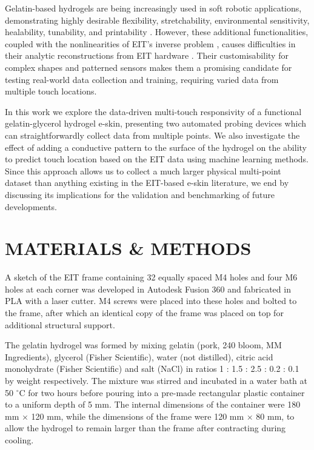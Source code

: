 Gelatin-based hydrogels are being increasingly used in soft robotic applications, demonstrating highly desirable flexibility, stretchability, environmental sensitivity, healability, tunability, and printability \cite{Heiden2022, Hardman2022, baumgartner2020resilient}. However, these additional functionalities, coupled with the nonlinearities of EIT's inverse problem \cite{Khan2019, Santosa1990}, causes difficulties in their analytic reconstructions from EIT hardware \cite{hardman2023tactile}. Their customisability for complex shapes and patterned sensors makes them a promising candidate for testing real-world data collection and training, requiring varied data from multiple touch locations.

In this work we explore the data-driven multi-touch responsivity of a functional gelatin-glycerol hydrogel e-skin, presenting two automated probing devices which can straightforwardly collect data from multiple points. We also investigate the effect of adding a conductive pattern to the surface of the hydrogel on the ability to predict touch location based on the EIT data using machine learning methods. Since this approach allows us to collect a much larger physical multi-point dataset than anything existing in the EIT-based e-skin literature, we end by discussing its implications for the validation and benchmarking of future developments.


\section{MATERIALS \& METHODS}
A sketch of the EIT frame containing 32 equally spaced M4 holes and four M6 holes at each corner was developed in Autodesk Fusion 360 and fabricated in PLA with a laser cutter. M4 screws were placed into these holes and bolted to the frame, after which an identical copy of the frame was placed on top for additional structural support.

The gelatin hydrogel was formed by mixing gelatin (pork, 240 bloom, MM Ingredients), glycerol (Fisher Scientific), water (not distilled), citric acid monohydrate (Fisher Scientific) and salt (NaCl) in ratios 1 : 1.5 : 2.5 : 0.2 : 0.1 by weight respectively. The mixture was stirred and incubated in a water bath at 50 $^{\circ}$C for two hours before pouring into a pre-made rectangular plastic container to a uniform depth of 5 mm. The internal dimensions of the container were 180 mm $ \times $ 120 mm, while the dimensions of the frame were 120 mm $ \times $ 80 mm, to allow the hydrogel to remain larger than the frame after contracting during cooling.


